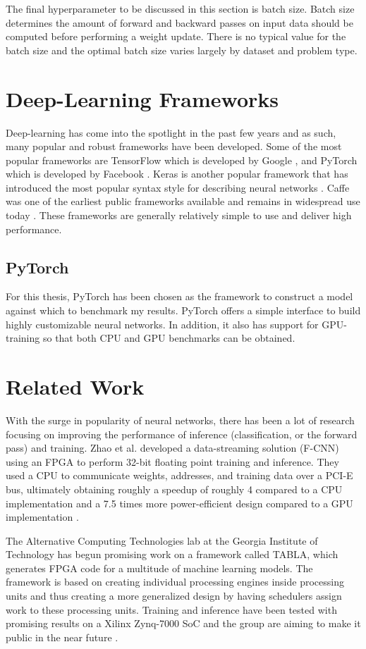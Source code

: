 The final hyperparameter to be discussed in this section is batch size. Batch size determines the amount of forward and backward passes on input data should be computed before performing a weight update. There is no typical value for the batch size and the optimal batch size varies largely by dataset and problem type.

\section{Deep-Learning Frameworks}
Deep-learning has come into the spotlight in the past few years and as such, many popular and robust frameworks have been developed. Some of the most popular frameworks are TensorFlow which is developed by Google \cite{tensorflow2015-whitepaper}, and PyTorch which is developed by Facebook \cite{paszke2017automatic}. Keras is another popular framework that has introduced the most popular syntax style for describing neural networks \cite{chollet2015keras}. Caffe was one of the earliest public frameworks available and remains in widespread use today \cite{caffe}. These frameworks are generally relatively simple to use and deliver high performance. 


\subsection{PyTorch}
For this thesis, PyTorch has been chosen as the framework to construct a model against which to benchmark my results. PyTorch offers a simple interface to build highly customizable neural networks. In addition, it also has support for GPU-training so that both CPU and GPU benchmarks can be obtained.

\section{Related Work}
With the surge in popularity of neural networks, there has been a lot of research focusing on improving the performance of inference (classification, or the forward pass) and training. Zhao et al. developed a data-streaming solution (F-CNN) using an FPGA to perform 32-bit floating point training and inference. They used a CPU to communicate weights, addresses, and training data over a PCI-E bus, ultimately obtaining roughly a speedup of roughly 4 compared to a CPU implementation and a 7.5 times more power-efficient design compared to a GPU implementation \cite{FCNN}.

The Alternative Computing Technologies lab at the  Georgia Institute of Technology has begun promising work on a framework called TABLA, which generates FPGA code for a multitude of machine learning models. The framework is based on creating individual processing engines inside processing units and thus creating a more generalized design by having schedulers assign work to these processing units. Training and inference have been tested with promising results on a Xilinx Zynq-7000 SoC and the group are aiming to make it public in the near future \cite{TABLA}.


